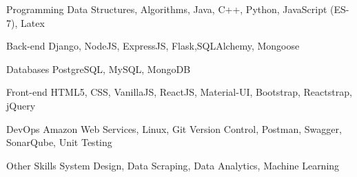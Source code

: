 

\begin{cvskills}

  \cvskill
    {Programming} %
    {Data Structures, Algorithms, Java, C++, Python, JavaScript (ES-7), Latex} %

  \cvskill
    {Back-end} %
    {Django, NodeJS, ExpressJS, Flask,SQLAlchemy, Mongoose} %

    \cvskill
    {Databases} %
    {PostgreSQL, MySQL, MongoDB} %

  \cvskill
    {Front-end} %
    {HTML5, CSS, VanillaJS, ReactJS, Material-UI, Bootstrap, Reactstrap, jQuery} %



  \cvskill
    {DevOps} %
    {Amazon Web Services, Linux, Git Version Control, Postman, Swagger, SonarQube, Unit Testing } %

\cvskill
    {Other Skills} %
    {System Design, Data Scraping, Data Analytics, Machine Learning} %
    
\end{cvskills}
